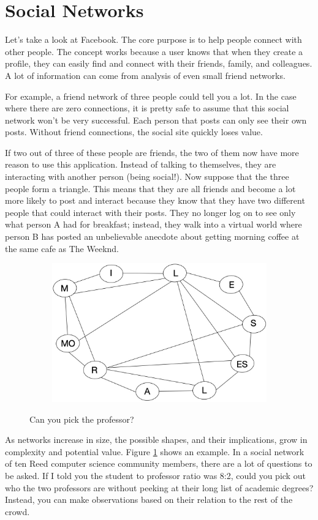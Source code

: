 \documentclass[12pt,twoside]{reedthesis}
\begin{document}
\section{Social Networks}
Let's take a look at Facebook. The core purpose is to help people connect with other people. The concept works because a user knows that when they create a profile, they can easily find and connect with their friends, family, and colleagues.  A lot of information can come from analysis of even small friend networks.

For example, a friend network of three people could tell you a lot. In the case where there are zero connections, it is pretty safe to assume that this social network won't be very successful. Each person that posts can only see their own posts. Without friend connections, the social site quickly loses value. 

If two out of three of these people are friends, the two of them now have more reason to use this application. Instead of talking to themselves, they are interacting with another person (being social!). Now suppose that the three people form a triangle. This means that they are all friends and become a lot more likely to post and interact because they know that they have two different people that could interact with their posts. They no longer log on to see only what person A had for breakfast; instead, they walk into a virtual world where person B has posted an unbelievable anecdote about getting morning coffee at the same cafe as The Weeknd.

\begin{figure}[h]
	\caption{Can you pick the professor?}
	\centering
	\includegraphics[width=13cm, height=6cm]{professors}
	\label{fig:professors}
\end{figure}


As networks increase in size, the possible shapes, and their implications, grow in complexity and potential value. Figure \ref{fig:professors} shows an example. In a social network of ten Reed computer science community members, there are a lot of questions to be asked. If I told you the student to professor ratio was 8:2, could you pick out who the two professors are without peeking at their long list of academic degrees? Instead, you can make observations based on their relation to the rest of the crowd. 
\end{document}
